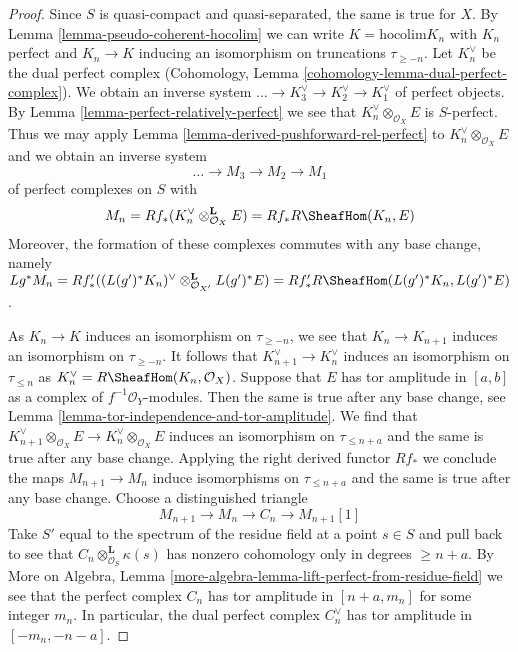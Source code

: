 \begin{proof}
Since $S$ is quasi-compact and quasi-separated, the same is true for $X$.
By Lemma \ref{lemma-pseudo-coherent-hocolim} we can write
$K = \text{hocolim} K_n$ with $K_n$ perfect and $K_n \to K$ inducing
an isomorphism on truncations $\tau_{\geq -n}$. Let $K_n^\vee$
be the dual perfect complex
(Cohomology, Lemma \ref{cohomology-lemma-dual-perfect-complex}).
We obtain an inverse system $\ldots \to K_3^\vee \to K_2^\vee \to K_1^\vee$
of perfect objects. By Lemma \ref{lemma-perfect-relatively-perfect}
we see that $K_n^\vee \otimes_{\mathcal{O}_X} E$ is $S$-perfect.
Thus we may apply Lemma \ref{lemma-derived-pushforward-rel-perfect}
to $K_n^\vee \otimes_{\mathcal{O}_X} E$ and we obtain an inverse system
$$
\ldots \to M_3 \to M_2 \to M_1
$$
of perfect complexes on $S$ with
$$
M_n = Rf_*(K_n^\vee \otimes_{\mathcal{O}_X}^\mathbf{L} E) =
Rf_*R\SheafHom(K_n, E)
$$
Moreover, the formation of these complexes commutes with any
base change, namely $Lg^*M_n =
Rf'_*((L(g')^*K_n)^\vee \otimes_{\mathcal{O}_{X'}}^\mathbf{L} L(g')^*E) =
Rf'_*R\SheafHom(L(g')^*K_n, L(g')^*E)$.

\medskip\noindent
As $K_n \to K$ induces an isomorphism on $\tau_{\geq -n}$, we see that
$K_n \to K_{n + 1}$ induces an isomorphism on $\tau_{\geq -n}$.
It follows that $K_{n + 1}^\vee \to K_n^\vee$
induces an isomorphism on $\tau_{\leq n}$ as
$K_n^\vee = R\SheafHom(K_n, \mathcal{O}_X)$.
Suppose that $E$ has tor amplitude in $[a, b]$ as a complex
of $f^{-1}\mathcal{O}_Y$-modules. Then the same is true after
any base change, see Lemma \ref{lemma-tor-independence-and-tor-amplitude}.
We find that
$K_{n + 1}^\vee \otimes_{\mathcal{O}_X} E \to
K_n^\vee \otimes_{\mathcal{O}_X} E$
induces an isomorphism on $\tau_{\leq n + a}$
and the same is true after any base change.
Applying the right derived functor $Rf_*$
we conclude the maps $M_{n + 1} \to M_n$
induce isomorphisms on $\tau_{\leq n + a}$
and the same is true after any base change.
Choose a distinguished triangle
$$
M_{n + 1} \to M_n \to C_n \to M_{n + 1}[1]
$$
Take $S'$ equal to the spectrum of the residue field at a point
$s \in S$ and pull back to see that
$C_n \otimes_{\mathcal{O}_S}^\mathbf{L} \kappa(s)$
has nonzero cohomology only in degrees $\geq n + a$. By
More on Algebra, Lemma
\ref{more-algebra-lemma-lift-perfect-from-residue-field}
we see that the perfect complex $C_n$ has tor amplitude in
$[n + a, m_n]$ for some integer $m_n$.
In particular, the dual perfect complex $C_n^\vee$ has tor amplitude in
$[-m_n, -n - a]$.


\end{proof}
